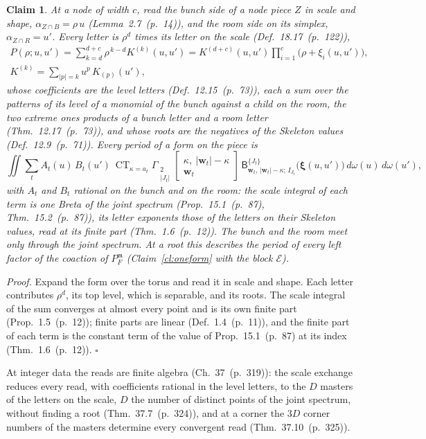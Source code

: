 \documentclass[11pt]{article}
\newcommand{\cE}{\mathcal E}
\newcommand{\sB}{\mathsf B}
\newcommand{\Gst}[4]{\Gamma_{\substack{#1\\#2}}\!\begin{bmatrix}#3\\#4\end{bmatrix}}
\DeclareMathOperator*{\CT}{CT}
\newcommand{\hb}[2]{#1~(p.~#2)}   %
\theoremstyle{plain}
\newtheorem{claim}{Claim}[section]
\theoremstyle{remark}
\begin{document}
\begin{claim}\label{cl:hinge14}
At a node of width $c$, read the bunch side of a node piece $Z$ in scale and shape, $\alpha_{Z\cap B}=\rho\,u$ (Lemma~\hb{2.7}{14}), and the room side on its simplex, $\alpha_{Z\cap R}=u'$. Every letter is $\rho^{d}$ times its letter on the scale (Def.~\hb{18.17}{122}),
\begin{gather*}
P(\rho;u,u')=\sum_{k=d}^{d+c}\rho^{\,k-d}K^{(k)}(u,u')=K^{(d+c)}(u,u')\prod_{i=1}^{c}\big(\rho+\xi_i(u,u')\big),\\
K^{(k)}=\sum_{|p|=k}u^{p}\,K_{(p)}(u'),
\end{gather*}
whose coefficients are the level letters (Def.~\hb{12.15}{73}), each a sum over the patterns of its level of a monomial of the bunch against a child on the room, the two extreme ones products of a bunch letter and a room letter (Thm.~\hb{12.17}{73}), and whose roots are the negatives of the Skeleton values (Def.~\hb{12.9}{71}). Every period of a form on the piece is
\[
\iint\sum_tA_t(u)\,B_t(u')\ \CT_{\kappa=a_t}\Gst2{|J_t|}{\kappa,\ |\mathbf w_t|-\kappa}{\mathbf w_t}\,\sB^{\{J_t\}}_{\mathbf w_t,\,|\mathbf w_t|-\kappa;\,I_{J_t}}\big(\boldsymbol\xi(u,u')\big)\,d\omega(u)\,d\omega(u'),
\]
with $A_t$ and $B_t$ rational on the bunch and on the room: the scale integral of each term is one Breta of the joint spectrum (Prop.~\hb{15.1}{87}, Thm.~\hb{15.2}{87}), its letter exponents those of the letters on their Skeleton values, read at its finite part (Thm.~\hb{1.6}{12}). The bunch and the room meet only through the joint spectrum. At a root this describes the period of every left factor of the coaction of $P_F^{\mathfrak m}$ (Claim~\ref{cl:oneform} with the block $\cE$).
\end{claim}

\emph{Proof.} Expand the form over the torus and read it in scale and shape. Each letter contributes $\rho^{d}$, its top level, which is separable, and its roots. The scale integral of the sum converges at almost every point and is its own finite part (Prop.~\hb{1.5}{12}); finite parts are linear (Def.~\hb{1.4}{11}), and the finite part of each term is the constant term of the value of Prop.~\hb{15.1}{87} at its index (Thm.~\hb{1.6}{12}). $\square$

At integer data the reads are finite algebra (Ch.~\hb{37}{319}): the scale exchange reduces every read, with coefficients rational in the level letters, to the $D$ masters of the letters on the scale, $D$ the number of distinct points of the joint spectrum, without finding a root (Thm.~\hb{37.7}{324}), and at a corner the $3D$ corner numbers of the masters determine every convergent read (Thm.~\hb{37.10}{325}).
\end{document}
